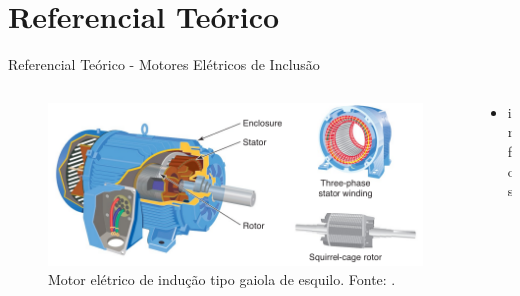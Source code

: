 \documentclass[aspectratio=169]{beamer}
\begin{document}
\section{Referencial Teórico}
\begin{frame}{Referencial Teórico - Motores Elétricos de Inclusão}
	\begin{columns}
    	\begin{column}{0.50\textwidth}
			\begin{figure}[HT]
				\begin{center}
					\captionsetup{justification=justified}
					\includegraphics[scale=.3]{../referencial/img/ind_motor_petruzella_p115.png}
					\caption{Motor elétrico de indução tipo gaiola de esquilo. \newline
					Fonte: .}
					\label{fig:ind_motor_petruzella_p115}
				\end{center}
			\end{figure}
     	\end{column}
		
		\begin{column}{0.5\textwidth}
			\begin{itemize}
				\item infos
			\end{itemize}
	 	\end{column}
	 \end{columns}
\end{frame}

\end{document}
